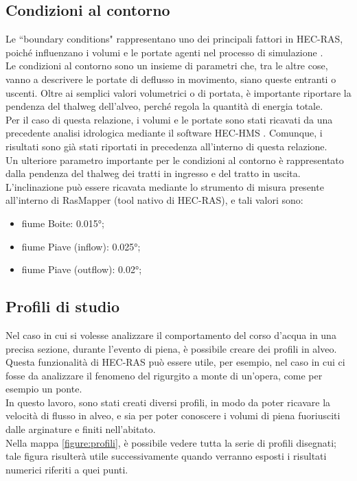 \subsection{Condizioni al contorno}
Le ``boundary conditions" rappresentano uno dei principali fattori in HEC-RAS, poiché influenzano i volumi e le portate agenti nel processo di simulazione \cite{boundary_conditions}.\\
Le condizioni al contorno sono un insieme di parametri che, tra le altre cose, vanno a descrivere le portate di deflusso in movimento, siano queste entranti o uscenti. Oltre ai semplici valori volumetrici o di portata, è importante riportare la pendenza del thalweg dell'alveo, perché regola la quantità di energia totale.\\
Per il caso di questa relazione, i volumi e le portate sono stati ricavati da una precedente analisi idrologica mediante il software HEC-HMS \cite{progetto_hms}. Comunque, i risultati sono già stati riportati in precedenza all'interno di questa relazione.\\
Un ulteriore parametro importante per le condizioni al contorno è rappresentato dalla pendenza del thalweg dei tratti in ingresso e del tratto in uscita.\\
L'inclinazione può essere ricavata mediante lo strumento di misura presente all'interno di RasMapper (tool nativo di HEC-RAS), e tali valori sono:
\begin{itemize}
    \item fiume Boite: 0.015°;
    \item fiume Piave (inflow): 0.025°;
    \item fiume Piave (outflow): 0.02°;
\end{itemize}

\subsection{Profili di studio}
Nel caso in cui si volesse analizzare il comportamento del corso d'acqua in una precisa sezione, durante l'evento di piena, è possibile creare dei profili in alveo. Questa funzionalità di HEC-RAS può essere utile, per esempio, nel caso in cui ci fosse da analizzare il fenomeno del rigurgito a monte di un'opera, come per esempio un ponte.\\
In questo lavoro, sono stati creati diversi profili, in modo da poter ricavare la velocità di flusso in alveo, e sia per poter conoscere i volumi di piena fuoriusciti dalle arginature e finiti nell'abitato.\\
Nella mappa \eqref{figure:profili}, è possibile vedere tutta la serie di profili disegnati; tale figura risulterà utile successivamente quando verranno esposti i risultati numerici riferiti a quei punti.

